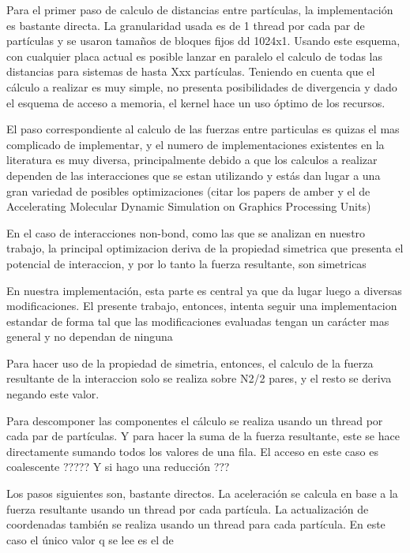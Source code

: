 Para el primer paso de calculo de distancias entre partículas, la implementación es bastante directa. La granularidad usada es de 1 thread por cada par de partículas y se usaron tamaños de bloques fijos dd 1024x1.
Usando este esquema, con cualquier placa actual es posible lanzar en paralelo el calculo de todas las distancias para sistemas de hasta Xxx partículas. Teniendo en cuenta  que  el cálculo a realizar es muy simple, no presenta posibilidades de divergencia y dado el esquema de acceso a memoria, el kernel hace un uso óptimo de los recursos.

El paso correspondiente al calculo de las fuerzas entre particulas es quizas el mas complicado de implementar, y el numero de implementaciones existentes en la literatura es muy diversa, principalmente debido a que los calculos a realizar dependen de las interacciones que se estan utilizando y estás dan lugar a una gran variedad de posibles optimizaciones
\cite{friedrichs2009accelerating}\cite{gotz2012routine}\cite{salomon2013routine}
(citar los papers de amber y el de Accelerating Molecular Dynamic Simulation on Graphics Processing Units)

En el caso de interacciones non-bond, como las que se analizan en nuestro trabajo, la principal optimizacion deriva de la propiedad simetrica que presenta el potencial de interaccion, y por lo tanto la fuerza resultante, son simetricas

En nuestra implementación, esta parte es central ya que da lugar luego a diversas modificaciones. El presente trabajo, entonces, intenta seguir una implementacion estandar de forma tal que las modificaciones evaluadas tengan un carácter mas general y no dependan de ninguna

Para hacer uso de la propiedad de simetria, entonces, el calculo de la fuerza resultante de la interaccion solo se realiza sobre N2/2 pares, y el resto se deriva negando este valor.

Para descomponer las componentes el cálculo se realiza usando un thread por cada par de partículas.
Y para hacer la suma de la fuerza resultante, este se hace directamente sumando todos los valores de una fila. El acceso en este caso es coalescente ????? Y si hago una reducción ???

Los pasos siguientes son, bastante directos.
La aceleración se calcula en base a la fuerza resultante usando un thread por cada partícula.
La actualización de coordenadas también se realiza usando un thread para cada partícula. En este caso el único valor q se lee es el de




